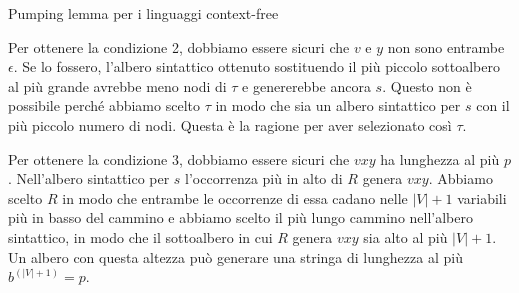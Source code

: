 \begin{Thm}{Pumping lemma per i linguaggi context-free}{}
\begin{demonstration}
Per ottenere la condizione 2, dobbiamo essere sicuri che $v$ e $y$ non sono entrambe $\epsilon$. Se lo fossero, l'albero sintattico ottenuto sostituendo il più piccolo sottoalbero al più grande avrebbe meno nodi di $\tau$ e genererebbe ancora $s$. Questo non è possibile perché abbiamo scelto $\tau$ in modo che sia un albero sintattico per $s$ con il più piccolo numero di nodi. Questa è la ragione per aver selezionato così $\tau$.

Per ottenere la condizione 3, dobbiamo essere sicuri che $vxy$ ha lunghezza al più $p$. Nell'albero sintattico per $s$ l'occorrenza più in alto di $R$ genera $vxy$. Abbiamo scelto $R$ in modo che entrambe le occorrenze di essa cadano nelle $|V| + 1$ variabili più in basso del cammino e abbiamo scelto il più lungo cammino nell'albero sintattico, in modo che il sottoalbero in cui $R$ genera $vxy$ sia alto al più $|V| + 1$. Un albero con questa altezza può generare una stringa di lunghezza al più $b ^{(|V| + 1)} = p$.
\end{demonstration}
\end{Thm}

